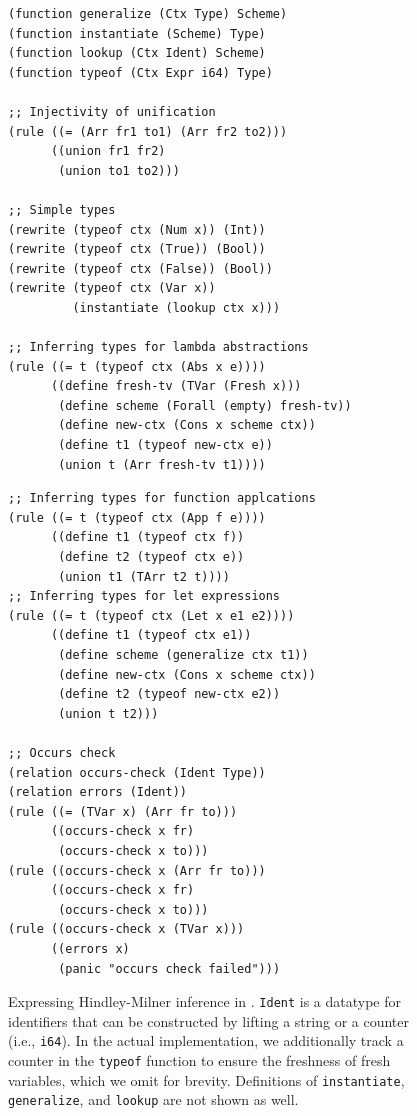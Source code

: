 \begin{figure}
\begin{minipage}[t]{0.48\linewidth}
    \begin{lstlisting}[language=egglog]
(function generalize (Ctx Type) Scheme)
(function instantiate (Scheme) Type)
(function lookup (Ctx Ident) Scheme)
(function typeof (Ctx Expr i64) Type)

;; Injectivity of unification
(rule ((= (Arr fr1 to1) (Arr fr2 to2)))
      ((union fr1 fr2)
       (union to1 to2)))

;; Simple types
(rewrite (typeof ctx (Num x)) (Int))
(rewrite (typeof ctx (True)) (Bool))
(rewrite (typeof ctx (False)) (Bool))
(rewrite (typeof ctx (Var x))
         (instantiate (lookup ctx x)))

;; Inferring types for lambda abstractions
(rule ((= t (typeof ctx (Abs x e))))
      ((define fresh-tv (TVar (Fresh x)))
       (define scheme (Forall (empty) fresh-tv))
       (define new-ctx (Cons x scheme ctx))
       (define t1 (typeof new-ctx e))
       (union t (Arr fresh-tv t1))))
    \end{lstlisting}
\end{minipage}
\hfill
\begin{minipage}[t]{0.48\linewidth}
    \begin{lstlisting}[language=egglog]
;; Inferring types for function applcations
(rule ((= t (typeof ctx (App f e))))
	  ((define t1 (typeof ctx f))
	   (define t2 (typeof ctx e))
	   (union t1 (TArr t2 t))))
;; Inferring types for let expressions
(rule ((= t (typeof ctx (Let x e1 e2))))
      ((define t1 (typeof ctx e1))
       (define scheme (generalize ctx t1))
       (define new-ctx (Cons x scheme ctx))
       (define t2 (typeof new-ctx e2))
       (union t t2)))

;; Occurs check
(relation occurs-check (Ident Type))
(relation errors (Ident))
(rule ((= (TVar x) (Arr fr to)))
      ((occurs-check x fr)
       (occurs-check x to)))
(rule ((occurs-check x (Arr fr to)))
      ((occurs-check x fr)
       (occurs-check x to)))
(rule ((occurs-check x (TVar x)))
      ((errors x)
       (panic "occurs check failed")))
    \end{lstlisting}
\end{minipage}
\caption{Expressing Hindley-Milner inference in \egglog.
 \lstinline{Ident} is a datatype for identifiers
  that can be constructed by lifting a string or a counter (i.e., \lstinline{i64}).
 In the actual implementation,
  we additionally track a counter in the \lstinline{typeof} function
  to ensure the freshness of fresh variables,
  which we omit for brevity.
 Definitions of \lstinline{instantiate}, \lstinline{generalize},
 and \lstinline{lookup} are not shown as well.
 }
 \label{fig:hm}
\end{figure}

